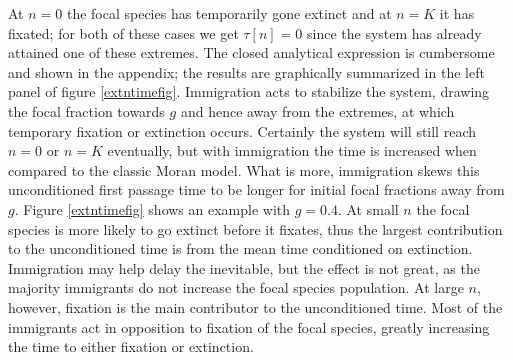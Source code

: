 At $n=0$ the focal species has temporarily gone extinct and at $n=K$ it has fixated; for both of these cases we get $\tau[n]=0$ since the system has already attained one of these extremes. %
The closed analytical expression is cumbersome and shown in the appendix; the results are graphically summarized in the left panel of figure \ref{extntimefig}. 
Immigration acts to stabilize the system, drawing the focal fraction towards $g$ and hence away from the extremes, at which temporary fixation or extinction occurs. 
Certainly the system will still reach $n=0$ or $n=K$ eventually, but with immigration the time is increased when compared to the classic Moran model. 
What is more, immigration skews this unconditioned first passage time to be longer for initial focal fractions away from $g$. 
Figure \ref{extntimefig} shows an example with $g=0.4$. 
At small $n$ the focal species is more likely to go extinct before it fixates, thus the largest contribution to the unconditioned time is from the mean time conditioned on extinction. Immigration may help delay the inevitable, but the effect is not great, as the majority immigrants do not increase the focal species population. %
At large $n$, however, fixation is the main contributor to the unconditioned time. 
Most of the immigrants act in opposition to fixation of the focal species, greatly increasing the time to either fixation or extinction. 

